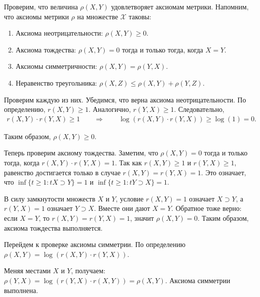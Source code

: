 \documentclass[../main.tex]{subfiles}
\begin{document}
Проверим, что величина $ \rho (X, Y)$ удовлетворяет аксиомам метрики. 
Напомним, что аксиомы метрики $\rho$ на множестве $\mathcal{X}$ таковы:
\begin{enumerate}
	\item Аксиома неотрицательности: $\rho(X,Y) \geqslant 0$.
	\item Аксиома тождества:  $\rho(X,Y) = 0 $ тогда и только тогда, когда $X = Y$.
	\item Аксиомы симметричности: $ \rho(X,Y) = \rho(Y,X) $.
	\item Неравенство треугольника:  $ \rho(X,Z) \leqslant \rho(X,Y) + \rho(Y,Z) $.
\end{enumerate}

Проверим каждую из них. 
Убедимся, что верна аксиома неотрицательности. 
По определению, $r(X,Y) \geqslant 1$. 
Аналогично, $ r(Y,X) \geqslant 1  $. 
Следовательно, 
\begin{gather*}
	r(X,Y)\cdot r(Y,X)  \geqslant 1  \qquad \Rightarrow \qquad
	 \log(r(X,Y) \cdot r(Y,X)) \geqslant \log(1) = 0.
\end{gather*}

Таким образом, $ \rho(X,Y) \geqslant 0 $.


Теперь проверим аксиому  тождества.
Заметим, что $\rho(X,Y) = 0 $ тогда и только тогда, когда $ r(X,Y) \cdot r(Y,X) = 1$.
Так как $r(X,Y) \geqslant 1 $ и $r(Y,X) \geqslant 1 $, равенство достигается только в случае $r(X,Y) = r(Y,X) = 1 $.
Это означает, что $\inf\{t \geqslant 1 : tX \supset Y \} = 1$ и $\inf\{t \geqslant 1 : tY \supset X \} = 1$.

В силу замкнутости множеств $X$  и $Y$, условие  $ r(X,Y)=1$ означает $X \supset Y$, а  $r(Y,X)=1$ означает  $Y \supset X$. 
Вместе они дают $X=Y$.
Обратное тоже верно: если $X=Y$, то  $r(X,Y)=r(Y,X)=1$, значит $\rho(X,Y)=0$.
Таким образом, аксиома тождества выполняется.

Перейдем к проверке аксиомы симметрии. 
По определению 	$\rho(X,Y)= \log(r(X,Y) \cdot r(Y,X))$.

Меняя местами $X$ и $Y$, получаем:
$\rho(Y, X) = \log(r(Y,X) \cdot r(X,Y))=\rho(X,Y).$
Аксиома симметрии выполнена.
\end{document}
